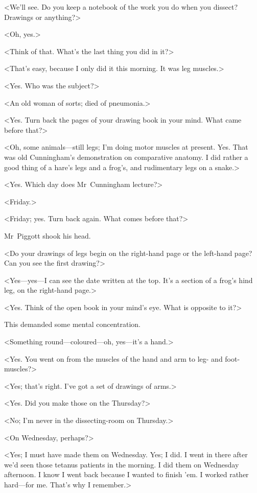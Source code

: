 <We'll see. Do you keep a notebook of the work you do when you dissect? Drawings or anything?>

<Oh, yes.>

<Think of that. What's the last thing you did in it?>

<That's easy, because I only did it this morning. It was leg muscles.>

<Yes. Who was the subject?>

<An old woman of sorts; died of pneumonia.>

<Yes. Turn back the pages of your drawing book in your mind. What came before that?>

<Oh, some animals—still legs; I'm doing motor muscles at present. Yes. That was old Cunningham's demonstration on comparative anatomy. I did rather a good thing of a hare's legs and a frog's, and rudimentary legs on a snake.>

<Yes. Which day does Mr~Cunningham lecture?>

<Friday.>

<Friday; yes. Turn back again. What comes before that?>

Mr~Piggott shook his head.

<Do your drawings of legs begin on the right-hand page or the left-hand page? Can you see the first drawing?>

<Yes—yes—I can see the date written at the top. It's a section of a frog's hind leg, on the right-hand page.>

<Yes. Think of the open book in your mind's eye. What is opposite to it?>

This demanded some mental concentration.

<Something round—coloured—oh, yes—it's a hand.>

<Yes. You went on from the muscles of the hand and arm to leg- and foot-muscles?>

<Yes; that's right. I've got a set of drawings of arms.>

<Yes. Did you make those on the Thursday?>

<No; I'm never in the dissecting-room on Thursday.>

<On Wednesday, perhaps?>

<Yes; I must have made them on Wednesday. Yes; I did. I went in there after we'd seen those tetanus patients in the morning. I did them on Wednesday afternoon. I know I went back because I wanted to finish 'em. I worked rather hard—for me. That's why I remember.>


